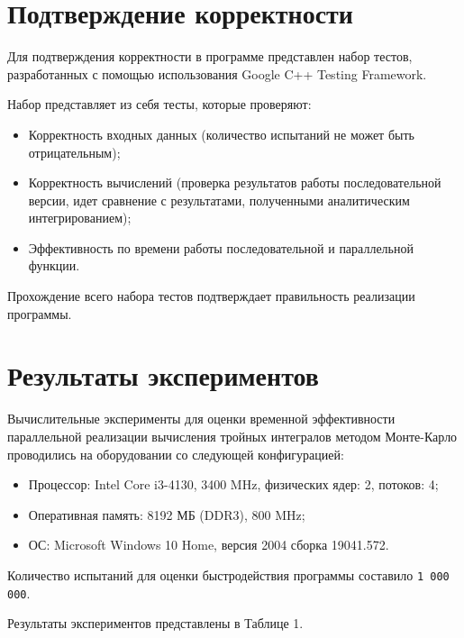 \documentclass{report}
\begin{document}
\section*{Подтверждение корректности}
Для подтверждения корректности в программе представлен набор тестов, разработанных с помощью использования Google C++ Testing Framework.
\par Набор представляет из себя тесты, которые проверяют:
\begin{itemize}
\item Корректность входных данных (количество испытаний не может быть отрицательным);
\item Корректность вычислений (проверка результатов работы последовательной версии, идет сравнение с результатами, полученными аналитическим интегрированием);
\item Эффективность по времени работы последовательной и параллельной функции.
\end{itemize}
\par Прохождение всего набора тестов подтверждает правильность реализации программы.
\newpage

\section*{Результаты экспериментов}
Вычислительные эксперименты для оценки временной эффективности параллельной реализации вычисления тройных интегралов методом Монте-Карло проводились на оборудовании со следующей конфигурацией:
\begin{itemize}
\item Процессор: Intel Core i3-4130, 3400 MHz, физических ядер: 2, потоков: 4;
\item Оперативная память: 8192 МБ (DDR3), 800 MHz;
\item ОС: Microsoft Windows 10 Home, версия 2004 сборка 19041.572.
\end{itemize}

\par Количество испытаний для оценки быстродействия программы составило \verb|1 000 000|. 
\par Результаты экспериментов представлены в Таблице 1.
\end{document}
